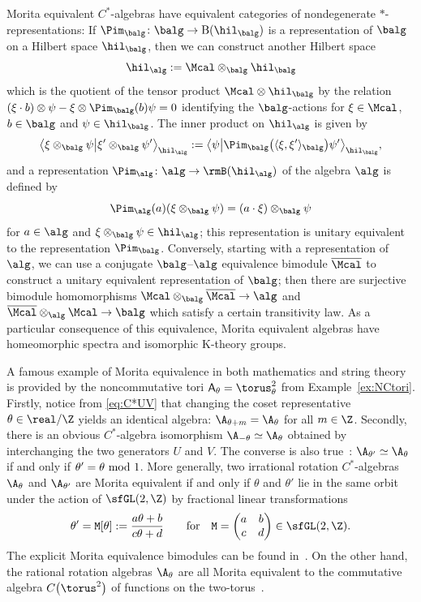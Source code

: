 Morita equivalent $C^*$-algebras have equivalent categories of
nondegenerate $*$-representations: If $\Pim_\balg\colon \balg\to{\rm B}(\hil_\balg)$ is a
representation of $\balg$ on a Hilbert space $\hil_\balg$, then we can
construct another Hilbert space
\[
\hil_\alg:=\Mcal\otimes_\balg\hil_\balg
\]
which is the quotient of the tensor product $\Mcal\otimes\hil_\balg$ by the relation $(\xi\cdot
b)\otimes\psi-\xi\otimes\Pim_\balg(b)\psi=0$ identifying the
$\balg$-actions for
$\xi\in\Mcal$, $b\in\balg$ and $\psi\in\hil_\balg$. The inner product
on $\hil_\alg$ is given by
\[
\big\langle\xi\otimes_\balg\psi\big|
\xi'\otimes_\balg\psi'\big\rangle_{\hil_\alg} :=
\big\langle\psi\big|\Pim_\balg\big(\langle\xi,\xi'\rangle_\balg
\big)\psi'\big\rangle_{\hil_\balg} ,
\]
and a representation $\Pim_\alg\colon \alg\to\rmB(\hil_\alg)$ of the algebra
$\alg$ is defined by
\[
\Pim_\alg(a)(\xi\otimes_\balg\psi) = (a\cdot\xi) \otimes_\balg\psi
\]
for $a\in\alg$ and $\xi\otimes_\balg\psi\in\hil_\alg$; this
representation is unitary equivalent to the representation
$\Pim_\balg$. Conversely, starting with a representation of $\alg$, we
can use a conjugate $\balg$--$\alg$ equivalence bimodule
$\overline{\Mcal}$ to construct a unitary equivalent representation of
$\balg$; then there are surjective bimodule homomorphisms
$\Mcal\otimes_\balg\overline{\Mcal}\to\alg$ and
$\overline{\Mcal}\otimes_\alg\Mcal\to\balg$ which satisfy a certain
transitivity law. As a particular consequence of this equivalence, Morita
equivalent algebras have homeomorphic spectra and isomorphic K-theory groups.

\begin{Example}\label{ex:NCT2Morita}
A famous example of Morita equivalence in both mathematics and string
theory is provided by the
noncommutative tori ${\sf A}_\theta=\torus_\theta^2$ from
Example~\ref{ex:NCtori}. Firstly, notice from \eqref{eq:C*UV} that
changing the coset representative $\theta\in\real/\Z$ yields an identical
algebra: $\A_{\theta+m}=\A_{\theta}$ for all $m\in\Z$. Secondly, there
is an obvious
$C^*$-algebra isomorphism $\A_{-\theta}\simeq\A_\theta$ obtained by
interchanging the two generators $U$ and $V$. The converse
is also true~\cite{Rieffel1981,Rieffel1982}:
$\A_{\theta'}\simeq\A_{\theta}$ if and only if $\theta'=\theta \ {\rm
 mod}~1$. More generally, two irrational rotation $C^*$-algebras
$\A_\theta$ and $\A_{\theta'}$ are
Morita equivalent if and only if $\theta$ and $\theta'$ lie in the
same orbit under the action of $\sfGL(2,\Z)$ by fractional linear
transformations
\[
\theta'={\tt M}[\theta]:=\frac{a \theta+b}{c \theta+d} \qquad
\mbox{for} \quad {\tt M}=\bigg(\begin{matrix} a & b \\ c &
 d \end{matrix}\bigg) \in \sfGL(2,\Z) .
\]
The explicit Morita equivalence bimodules can be found
in~\cite{Rieffel1981}. On the other hand, the rational rotation
algebras $\A_\theta$ are all Morita equivalent to the commutative
algebra $C\big(\torus^2\big)$ of functions on the
two-torus~\cite{Rieffel1982}.
\end{Example}

